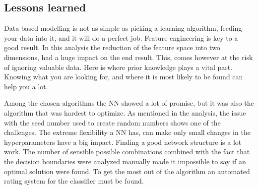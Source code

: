     \subsection{Lessons learned}
    
        Data based modelling is not as simple as picking a learning algorithm, feeding your data into it, and it will do a perfect job. Feature engineering is key to a good result. In this analysis the reduction of the feature space into two dimensions, had a huge impact on the end result. This, comes however at the risk of ignoring valuable data. Here is where prior knowledge plays a vital part. Knowing what you are looking for, and where it is most likely to be found can help you a lot. 
        
        Among the chosen algorithms the NN showed a lot of promise, but it was also the algorithm that was hardest to optimize. As mentioned in the analysis, the issue with the seed number used to create random numbers shows one of the challenges. The extreme flexibility a NN has, can make only small changes in the hyperparameters have a big impact. Finding a good network structure is a lot work. The number of sensible possible combinations combined with the fact that the decision boundaries were analyzed manually made it impossible to say if an optimal solution were found. To get the most out of the algorithm an automated rating system for the classifier must be found.  
        